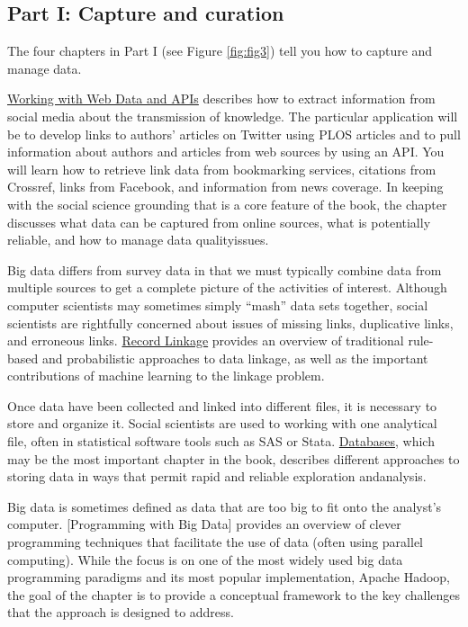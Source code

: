 \documentclass[]{krantz}
\begin{document}
\subsection{Part I: Capture and
curation}\label{part-i-capture-and-curation}

The four chapters in Part I (see Figure \ref{fig:fig3}) tell you how to
capture and manage data.

\protect\hyperlink{chap:web}{Working with Web Data and APIs} describes
how to extract information from social media about the transmission of
knowledge. The particular application will be to develop links to
authors' articles on Twitter using PLOS articles and to pull information
about authors and articles from web sources by using an API. You will
learn how to retrieve link data from bookmarking services, citations
from Crossref, links from Facebook, and information from news coverage.
In keeping with the social science grounding that is a core feature of
the book, the chapter discusses what data can be captured from online
sources, what is potentially reliable, and how to manage data
qualityissues.

Big data differs from survey data in that we must typically combine data
from multiple sources to get a complete picture of the activities of
interest. Although computer scientists may sometimes simply ``mash''
data sets together, social scientists are rightfully concerned about
issues of missing links, duplicative links, and erroneous links.
\protect\hyperlink{chap:link}{Record Linkage} provides an overview of
traditional rule-based and probabilistic approaches to data linkage, as
well as the important contributions of machine learning to the linkage
problem.

Once data have been collected and linked into different files, it is
necessary to store and organize it. Social scientists are used to
working with one analytical file, often in statistical software tools
such as SAS or Stata. \protect\hyperlink{chap:db}{Databases}, which may
be the most important chapter in the book, describes different
approaches to storing data in ways that permit rapid and reliable
exploration andanalysis.

Big data is sometimes defined as data that are too big to fit onto the
analyst's computer. {[}Programming with Big Data{]} provides an overview
of clever programming techniques that facilitate the use of data (often
using parallel computing). While the focus is on one of the most widely
used big data programming paradigms and its most popular implementation,
Apache Hadoop, the goal of the chapter is to provide a conceptual
framework to the key challenges that the approach is designed to
address.
\end{document}
